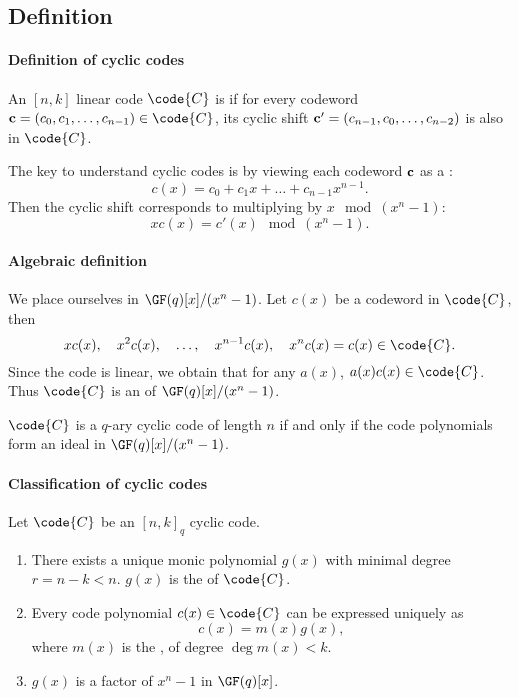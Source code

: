 \documentclass[a4paper, 11pt, openany]{book}
\begin{document}
\subsection{Definition}


\paragraph{Definition of cyclic codes}
An $[n,k]$ linear code $\code{C}$ is  if for every codeword ${\bf c} = (c_0, c_1, \dots, c_{n-1}) \in \code{C}$, its cyclic shift ${\bf c}' = (c_{n-1}, c_0, \dots, c_{n-2})$ is also in $\code{C}$.

The key to understand cyclic codes is by viewing each codeword ${\bf c}$ as a :
\[
	c(x) = c_0 + c_1 x + \dots + c_{n-1} x^{n-1}.
\]
Then the cyclic shift corresponds to multiplying by $x \mod (x^n-1)$:
\[
	x c(x) = c'(x) \mod (x^n - 1).
\]



\paragraph{Algebraic definition}
We place ourselves in $\GF(q)[x] / (x^n - 1)$. Let $c(x)$ be a codeword in $\code{C}$, then
\[
	x c(x), \quad x^2 c(x), \quad \dots, \quad x^{n-1} c(x), \quad x^n c(x) = c(x) \in \code{C}.
\]
Since the code is linear, we obtain that for any $a(x)$, $a(x)c(x) \in \code{C}$. Thus $\code{C}$ is an  of $\GF(q)[x] / (x^n - 1)$.

\begin{theorem}
$\code{C}$ is a $q$-ary cyclic code of length $n$ if and only if the code polynomials form an ideal in $\GF(q)[x] / (x^n - 1)$.
\end{theorem}



\paragraph{Classification of cyclic codes}
\begin{theorem}
Let $\code{C}$ be an $[n,k]_q$ cyclic code.
\begin{enumerate}
	\item There exists a unique monic polynomial $g(x)$ with minimal degree $r = n-k < n$. $g(x)$ is the  of $\code{C}$.

	\item Every code polynomial $c(x) \in \code{C}$ can be expressed uniquely as
	\[
		c(x) = m(x) g(x),
	\]
	where $m(x)$ is the , of degree $\deg m(x) < k$.

	\item $g(x)$ is a factor of $x^n - 1$ in $\GF(q)[x]$.
\end{enumerate}
\end{theorem}
\end{document}
